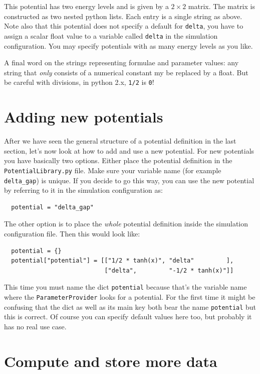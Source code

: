 \documentclass[a4paper,10pt]{report}
\begin{document}
This potential has two energy levels and is given by a $2 \times 2$ matrix.
The matrix is constructed as two nested python lists. Each entry is a single
string as above. Note also that this potential does not specify a default
for \texttt{delta}, you have to assign a scalar float value to a variable
called \texttt{delta} in the simulation configuration. You may specify potentials
with as many energy levels as you like.

A final word on the strings representing formulae and parameter values: any string
that \emph{only} consists of a numerical constant my be replaced by a float. But
be careful with divisions, in python 2.x, \texttt{1/2} is \texttt{0}!

\section{Adding new potentials}

After we have seen the general structure of a potential definition in the last
section, let's now look at how to add and use a new potential. For new potentials
you have basically two options. Either place the potential definition in the
\texttt{PotentialLibrary.py} file. Make sure your variable name (for example
\texttt{delta\_gap}) is unique. If you decide to go this way, you can use
the new potential by referring to it in the simulation configuration as:

\begin{verbatim}
  potential = "delta_gap"
\end{verbatim}

The other option is to place the \emph{whole} potential definition inside the
simulation configuration file. Then this would look like:

\begin{verbatim}
  potential = {}
  potential["potential"] = [["1/2 * tanh(x)", "delta"         ],
                            ["delta",         "-1/2 * tanh(x)"]]
\end{verbatim}

This time you must name the dict \texttt{potential} because that's the
variable name where the \texttt{ParameterProvider} looks for a potential.
For the first time it might be confusing that the dict as well as its main
key both bear the name \texttt{potential} but this is correct. Of course you
can specify default values here too, but probably it has no real use case.


\section{Compute and store more data}
\end{document}
